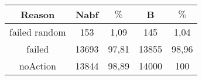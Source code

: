 \documentclass{article}
\begin{document}
\begin{tabular}{|c||c|c||c|c|}
\hline
Reason&Nabf& $\%$&B& $\%$\\
\hline
failed random&153&1,09&145&1,04\\

failed&13693&97,81&13855&98,96\\

noAction&13844&98,89&14000&100\\
\hline
\end{tabular}
\end{document}
